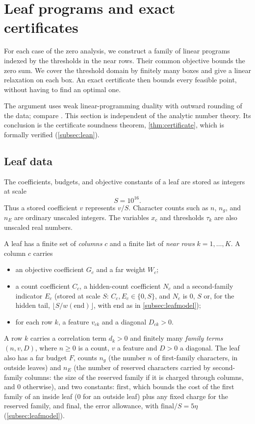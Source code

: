 \section{Leaf programs and exact certificates}\label{sec:lp}

For each case of the zero analysis, we construct a family of linear programs indexed by
the thresholds in the near rows. Their common objective bounds the zero sum. We cover
the threshold domain by finitely many boxes and give a linear relaxation on each box.
An exact certificate then bounds every feasible point, without having to find an
optimal one.

The argument uses weak linear-programming duality
\cite{Chvatal1983linear,Schrijver1986theory} with outward rounding of the data; compare
\cite{Jansson2004rigorous,NeumaierShcherbina2004safe,ApplegateCookDashEspinoza2007exact}.
This section is independent of the analytic number theory. Its conclusion is the
certificate soundness theorem, \cref{thm:certificate}, which is formally verified
(\cref{subsec:lean}).

\subsection{Leaf data}\label{subsec:leafdata}
The coefficients, budgets, and objective constants of a leaf are stored as integers
at scale
\[
  S=10^{16}.
\]
Thus a stored coefficient $v$ represents $v/S$. Character counts such as $n$, $n_g$,
and $n_E$ are ordinary unscaled integers. The variables $x_c$ and thresholds $\tau_k$
are also unscaled real numbers.

A leaf has a finite set of \emph{columns} $c$ and a finite list of \emph{near rows}
$k=1,\dots,K$. A column $c$ carries
\begin{itemize}
  \item an objective coefficient $G_c$ and a far weight $W_c$;
  \item a count coefficient $C_c$, a hidden-count coefficient $N_c$ and a second-family indicator
    $E_c$ (stored at scale $S$: $C_c,E_c\in\{0,S\}$, and $N_c$ is $0$, $S$ or, for the hidden tail,
    $\lfloor S/w(\mathrm{end})\rfloor$, with $\mathrm{end}$ as in \cref{subsec:leafmodel});
  \item for each row $k$, a feature $v_{ck}$ and a diagonal $D_{ck}>0$.
\end{itemize}
A row $k$ carries a correlation term $d_k>0$ and finitely many \emph{family terms} $(n,v,D)$, where
$n\ge0$ is a count, $v$ a feature and $D>0$ a diagonal. The leaf also has a far budget $F$, counts $n_g$ (the number $n$ of first-family characters, in
outside leaves) and $n_E$ (the number of reserved characters carried by second-family columns: the
size of the reserved family if it is charged through columns, and $0$ otherwise), and two
constants: $\mathrm{first}$, which bounds the cost of the first family of an inside leaf ($0$ for an
outside leaf) plus any fixed charge for the reserved family, and $\mathrm{final}$, the error
allowance, with $\mathrm{final}/S=5\eta$ (\cref{subsec:leafmodel}).

